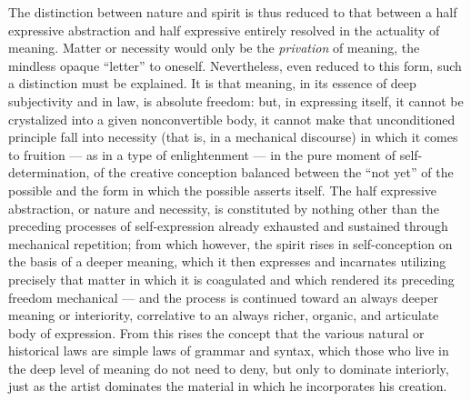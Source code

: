 The distinction between nature and spirit is thus reduced to that between a half expressive abstraction and half expressive entirely resolved in the actuality of meaning. Matter or necessity would only be the \emph{privation} of meaning, the mindless opaque ``letter'' to oneself. Nevertheless, even reduced to this form, such a distinction must be explained. It is that meaning, in its essence of deep subjectivity and in law, is absolute freedom: but, in expressing itself, it cannot be crystalized into a given nonconvertible body, it cannot make that unconditioned principle fall into necessity (that is, in a mechanical discourse) in which it comes to fruition --- as in a type of enlightenment --- in the pure moment of self-determination, of the creative conception balanced between the ``not yet'' of the possible and the form in which the possible asserts itself. The half expressive abstraction, or nature and necessity, is constituted by nothing other than the preceding processes of self-expression already exhausted and sustained through mechanical repetition; from which however, the spirit rises in self-conception on the basis of a deeper meaning, which it then expresses and incarnates utilizing precisely that matter in which it is coagulated and which rendered its preceding freedom mechanical --- and the process is continued toward an always deeper meaning or interiority, correlative to an always richer, organic, and articulate body of expression. From this rises the concept that the various natural or historical laws are simple laws of grammar and syntax, which those who live in the deep level of meaning do not need to deny, but only to dominate interiorly, just as the artist dominates the material in which he incorporates his creation.

